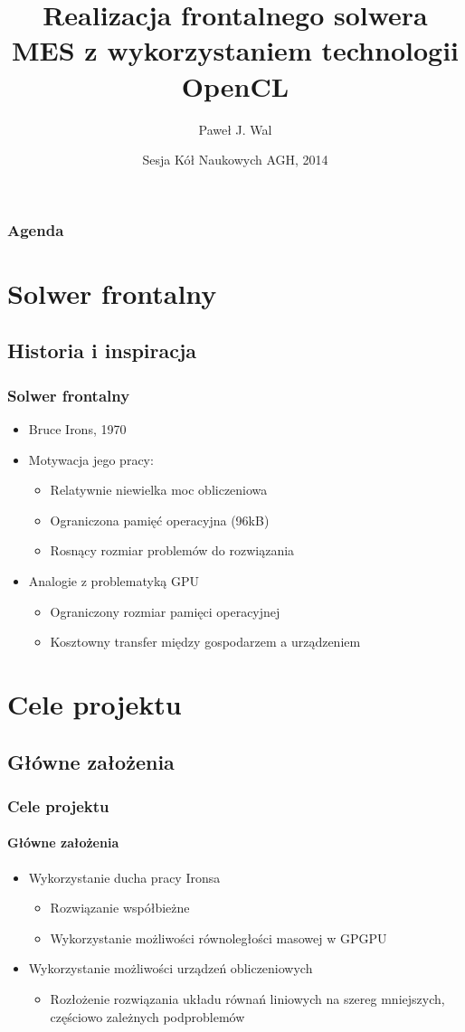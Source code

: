 \documentclass[12pt,handout]{beamer}
\title[Realizacja frontalnego solwera MES]{Realizacja frontalnego solwera MES z wykorzystaniem technologii OpenCL}
\author{Paweł J. Wal}
\institute{Wydział Inżynierii Metali i Informatyki Przemysłowej}
\date{Sesja Kół Naukowych AGH, 2014}
\begin{document}
	\frame{\titlepage}	

\begin{frame}[shrink]
\frametitle{Agenda}
\tableofcontents
\end{frame}	

\section{Solwer frontalny}	
\subsection{Historia i inspiracja}	
	
  \begin{frame}
    \frametitle{Solwer frontalny}

	\begin{itemize}[<+->]
		\item Bruce Irons, 1970
		\item Motywacja jego pracy:
		\begin{itemize}	
			\item Relatywnie niewielka moc obliczeniowa
			\item Ograniczona pamięć operacyjna (96kB)
			\item Rosnący rozmiar problemów do rozwiązania			
		\end{itemize}
		\item Analogie z problematyką GPU
		\begin{itemize}	
			\item Ograniczony rozmiar pamięci operacyjnej
			\item Kosztowny transfer między gospodarzem a urządzeniem
		\end{itemize}
	\end{itemize}
  \end{frame}

\section{Cele projektu}  
\subsection{Główne założenia}
  \begin{frame}
    \frametitle{Cele projektu}
    \framesubtitle{Główne założenia}
	\begin{itemize}[<+->]
	\item Wykorzystanie ducha pracy Ironsa
		\begin{itemize}
		\item Rozwiązanie współbieżne
		\item Wykorzystanie możliwości równoległości masowej w GPGPU
		\end{itemize}
	\item Wykorzystanie możliwości urządzeń obliczeniowych
		\begin{itemize}
			\item Rozłożenie rozwiązania układu równań liniowych na szereg mniejszych, częściowo zależnych podproblemów
		\end{itemize}
	\end{itemize}
  \end{frame}
\end{document}
